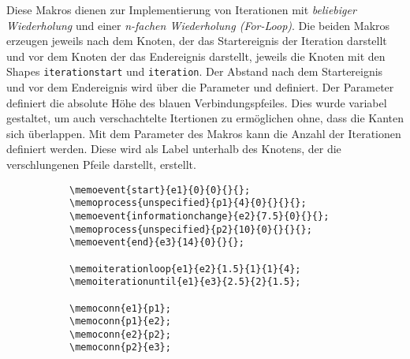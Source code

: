 \documentclass[12pt, a4paper]{article}
\begin{document}
\noindent Diese Makros dienen zur Implementierung von Iterationen mit \textit{beliebiger Wiederholung} und einer \textit{n-fachen Wiederholung (For-Loop)}.
Die beiden Makros erzeugen jeweils nach dem Knoten, der das Startereignis der Iteration darstellt und vor dem Knoten der das Endereignis darstellt, jeweils die Knoten mit den Shapes  \texttt{iterationstart} und \texttt{iteration}. Der Abstand nach dem Startereignis und vor dem Endereignis wird über die Parameter  und  definiert. Der Parameter  definiert die absolute Höhe des blauen Verbindungspfeiles. Dies wurde variabel gestaltet, um auch verschachtelte Itertionen zu ermöglichen ohne, dass die Kanten sich überlappen.\newline
Mit dem Parameter  des Makros kann die Anzahl der Iterationen definiert werden. Diese wird als Label unterhalb des Knotens, der die verschlungenen Pfeile darstellt, erstellt.
\begin{figure}[htbp]
    \centering
    \caption[Beispiel: Iterationen]{Beispiel: Iterationen}
    \begin{subfigure}{1\textwidth}
        \centering
    \end{subfigure}
    \begin{subfigure}{1\textwidth}
        \centering
        \begin{lstlisting}
\memoevent{start}{e1}{0}{0}{}{};
\memoprocess{unspecified}{p1}{4}{0}{}{}{};
\memoevent{informationchange}{e2}{7.5}{0}{}{};
\memoprocess{unspecified}{p2}{10}{0}{}{}{};
\memoevent{end}{e3}{14}{0}{}{};       	
		
\memoiterationloop{e1}{e2}{1.5}{1}{1}{4};
\memoiterationuntil{e1}{e3}{2.5}{2}{1.5};
		
\memoconn{e1}{p1};
\memoconn{p1}{e2};
\memoconn{e2}{p2};
\memoconn{p2}{e3};             
        \end{lstlisting}      
    \end{subfigure}
    \label{fig:IterationenBeispiel}
\end{figure} 
\end{document}
